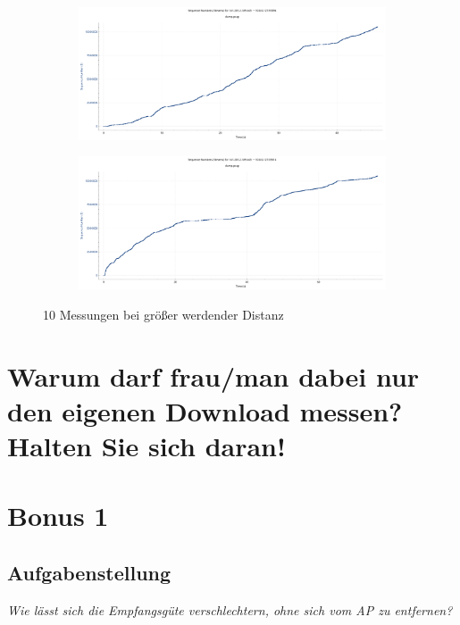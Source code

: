 \documentclass[
    pdftex,
    12pt,
    parskip=half,
    a4paper
]{scrartcl}
\begin{document}
\begin{figure}
\begin{subfigure}{0.5\textwidth}
	\end{subfigure}
	\begin{subfigure}{0.5\textwidth}
		\includegraphics[width=1\textwidth]{../1/wireshark/variable9.pdf}
	\end{subfigure}
	\begin{subfigure}{0.5\textwidth}
		\includegraphics[width=1\textwidth]{../1/wireshark/variable10.pdf}
	\end{subfigure}
	\caption{10 Messungen bei größer werdender Distanz}
\end{figure}

\section{Warum darf frau/man dabei nur den eigenen Download messen? Halten Sie sich daran!}
\vspace{5cm}%

\section{Bonus 1}
\subsection{Aufgabenstellung}
\textit{Wie lässt sich die Empfangsgüte verschlechtern, ohne sich vom AP zu entfernen?}
\vspace{5cm}%
\end{document}
